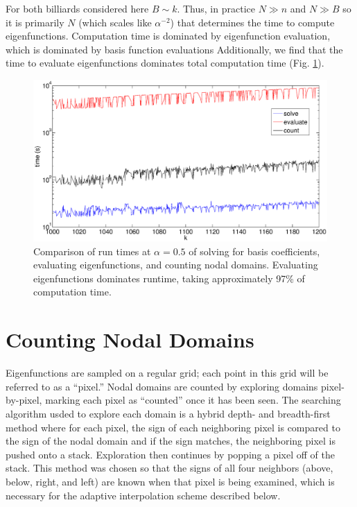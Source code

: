 \documentclass{report}
\begin{document}
For both billiards considered here $B \sim k$. Thus, in practice $N \gg n$ and $N \gg B$ so it is primarily $N$ (which scales like $\alpha^{-2}$) that determines the time to compute eigenfunctions. Computation time is dominated by eigenfunction evaluation, which is dominated by basis function evaluations Additionally, we find that the time to evaluate eigenfunctions dominates total computation time (Fig. \ref{fig:timing}).

\begin{figure}
  \begin{center}
    \includegraphics[width=\textwidth]{figs/timing/timing_comp_1000_to_1200.eps}
    \caption{Comparison of run times at $\alpha = 0.5$ of solving for basis coefficients, evaluating eigenfunctions, and counting nodal domains. Evaluating eigenfunctions dominates runtime, taking approximately 97\% of computation time.}
    \label{fig:timing}
  \end{center}
\end{figure}


\section{Counting Nodal Domains}
\label{sec:counting}
Eigenfunctions are sampled on a regular grid; each point in this grid will be referred to as a ``pixel.'' Nodal domains are counted by exploring domains pixel-by-pixel, marking each pixel as ``counted'' once it has been seen. The searching algorithm usded to explore each domain is a hybrid depth- and breadth-first method where for each pixel, the sign of each neighboring pixel is compared to the sign of the nodal domain and if the sign matches, the neighboring pixel is pushed onto a stack. Exploration then continues by popping a pixel off of the stack. This method was chosen so that the signs of all four neighbors (above, below, right, and left) are known when that pixel is being examined, which is necessary for the adaptive interpolation scheme described below.
\end{document}
